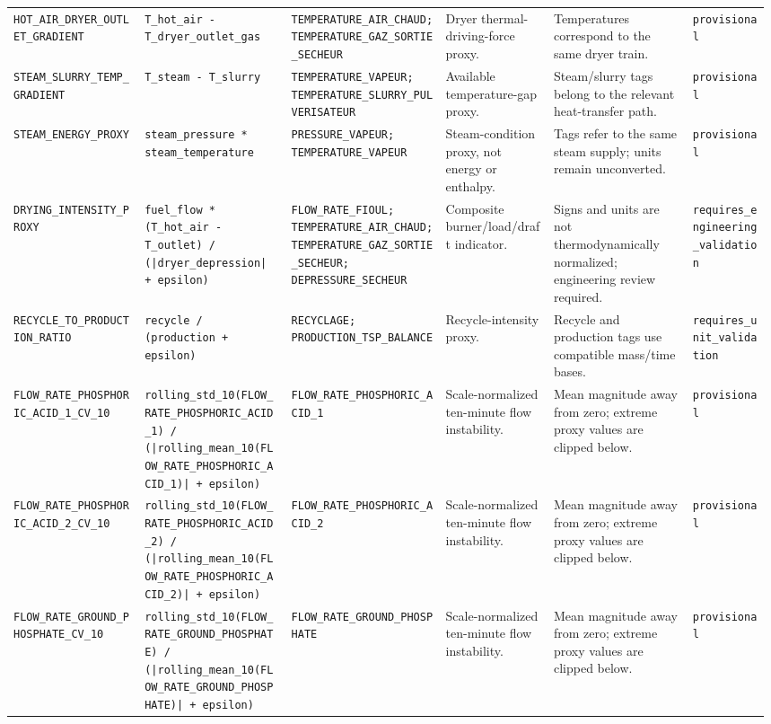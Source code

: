 \documentclass[10pt,a4paper]{article}
\begin{document}
\begin{landscape}
\begin{longtable}{p{0.17\linewidth}p{0.19\linewidth}p{0.20\linewidth}p{0.14\linewidth}p{0.18\linewidth}p{0.10\linewidth}}
\nolinkurl{HOT_AIR_DRYER_OUTLET_GRADIENT} & \nolinkurl{T_hot_air - T_dryer_outlet_gas} & \nolinkurl{TEMPERATURE_AIR_CHAUD; TEMPERATURE_GAZ_SORTIE_SECHEUR} & Dryer thermal-driving-force proxy. & Temperatures correspond to the same dryer train. & \nolinkurl{provisional} \\
\nolinkurl{STEAM_SLURRY_TEMP_GRADIENT} & \nolinkurl{T_steam - T_slurry} & \nolinkurl{TEMPERATURE_VAPEUR; TEMPERATURE_SLURRY_PULVERISATEUR} & Available temperature-gap proxy. & Steam/slurry tags belong to the relevant heat-transfer path. & \nolinkurl{provisional} \\
\nolinkurl{STEAM_ENERGY_PROXY} & \nolinkurl{steam_pressure * steam_temperature} & \nolinkurl{PRESSURE_VAPEUR; TEMPERATURE_VAPEUR} & Steam-condition proxy, not energy or enthalpy. & Tags refer to the same steam supply; units remain unconverted. & \nolinkurl{provisional} \\
\nolinkurl{DRYING_INTENSITY_PROXY} & \nolinkurl{fuel_flow * (T_hot_air - T_outlet) / (|dryer_depression| + epsilon)} & \nolinkurl{FLOW_RATE_FIOUL; TEMPERATURE_AIR_CHAUD; TEMPERATURE_GAZ_SORTIE_SECHEUR; DEPRESSURE_SECHEUR} & Composite burner/load/draft indicator. & Signs and units are not thermodynamically normalized; engineering review required. & \nolinkurl{requires_engineering_validation} \\
\nolinkurl{RECYCLE_TO_PRODUCTION_RATIO} & \nolinkurl{recycle / (production + epsilon)} & \nolinkurl{RECYCLAGE; PRODUCTION_TSP_BALANCE} & Recycle-intensity proxy. & Recycle and production tags use compatible mass/time bases. & \nolinkurl{requires_unit_validation} \\
\nolinkurl{FLOW_RATE_PHOSPHORIC_ACID_1_CV_10} & \nolinkurl{rolling_std_10(FLOW_RATE_PHOSPHORIC_ACID_1) / (|rolling_mean_10(FLOW_RATE_PHOSPHORIC_ACID_1)| + epsilon)} & \nolinkurl{FLOW_RATE_PHOSPHORIC_ACID_1} & Scale-normalized ten-minute flow instability. & Mean magnitude away from zero; extreme proxy values are clipped below. & \nolinkurl{provisional} \\
\nolinkurl{FLOW_RATE_PHOSPHORIC_ACID_2_CV_10} & \nolinkurl{rolling_std_10(FLOW_RATE_PHOSPHORIC_ACID_2) / (|rolling_mean_10(FLOW_RATE_PHOSPHORIC_ACID_2)| + epsilon)} & \nolinkurl{FLOW_RATE_PHOSPHORIC_ACID_2} & Scale-normalized ten-minute flow instability. & Mean magnitude away from zero; extreme proxy values are clipped below. & \nolinkurl{provisional} \\
\nolinkurl{FLOW_RATE_GROUND_PHOSPHATE_CV_10} & \nolinkurl{rolling_std_10(FLOW_RATE_GROUND_PHOSPHATE) / (|rolling_mean_10(FLOW_RATE_GROUND_PHOSPHATE)| + epsilon)} & \nolinkurl{FLOW_RATE_GROUND_PHOSPHATE} & Scale-normalized ten-minute flow instability. & Mean magnitude away from zero; extreme proxy values are clipped below. & \nolinkurl{provisional} \\

\end{longtable}
\end{landscape}
\end{document}
